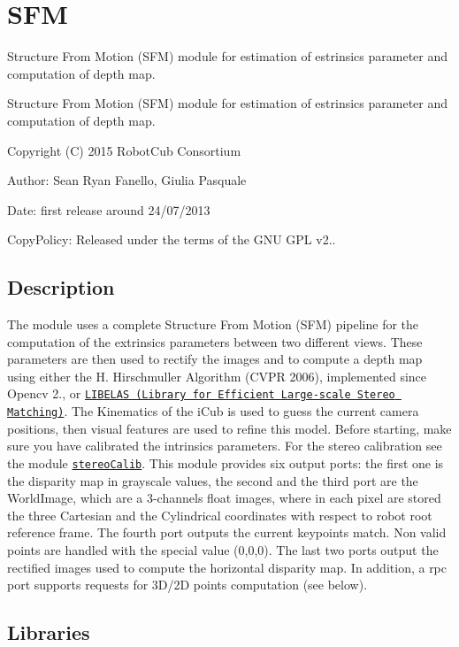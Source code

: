 \section{S\+FM}
\label{group__SFM}


Structure From Motion (S\+FM) module for estimation of estrinsics parameter and computation of depth map.  


Structure From Motion (S\+FM) module for estimation of estrinsics parameter and computation of depth map. 

Copyright (C) 2015 Robot\+Cub Consortium

Author\+: Sean Ryan Fanello, Giulia Pasquale

Date\+: first release around 24/07/2013

Copy\+Policy\+: Released under the terms of the G\+NU G\+PL v2..\hypertarget{group__SFM_intro_sec}{}\subsection{Description}\label{group__SFM_intro_sec}
The module uses a complete Structure From Motion (S\+FM) pipeline for the computation of the extrinsics parameters between two different views. These parameters are then used to rectify the images and to compute a depth map using either the H. Hirschmuller Algorithm (C\+V\+PR 2006), implemented since Opencv 2., or \href{http://www.cvlibs.net/software/libelas/}{\tt L\+I\+B\+E\+L\+AS (Library for Efficient Large-\/scale Stereo Matching)}. The Kinematics of the i\+Cub is used to guess the current camera positions, then visual features are used to refine this model. Before starting, make sure you have calibrated the intrinsics parameters. For the stereo calibration see the module \href{http://wiki.icub.org/iCub/main/dox/html/group__icub__stereoCalib.html}{\tt stereo\+Calib}. This module provides six output ports\+: the first one is the disparity map in grayscale values, the second and the third port are the World\+Image, which are a 3-\/channels float images, where in each pixel are stored the three Cartesian and the Cylindrical coordinates with respect to robot root reference frame. The fourth port outputs the current keypoints match. Non valid points are handled with the special value (0,0,0). The last two ports output the rectified images used to compute the horizontal disparity map. In addition, a rpc port supports requests for 3\+D/2D points computation (see below).\hypertarget{group__SFM_lib_sec}{}\subsection{Libraries}\label{group__SFM_lib_sec}
